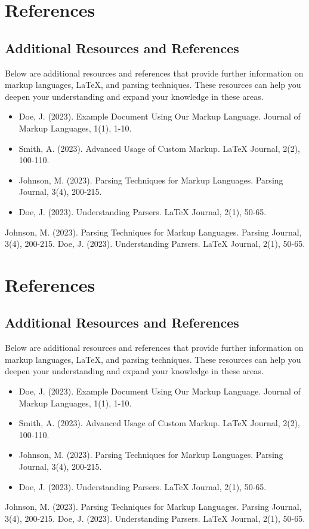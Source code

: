 \documentclass[oneside]{book}
\begin{document}
\newpage
\chapter{References}
\section{Additional Resources and References}
Below are additional resources and references that provide further information on markup languages, LaTeX, and parsing techniques. These resources can help you deepen your understanding and expand your knowledge in these areas.\par
\begin{itemize}
\item Doe, J. (2023). Example Document Using Our Markup Language. Journal of Markup Languages, 1(1), 1-10.
\item Smith, A. (2023). Advanced Usage of Custom Markup. LaTeX Journal, 2(2), 100-110.
\item Johnson, M. (2023). Parsing Techniques for Markup Languages. Parsing Journal, 3(4), 200-215.
\item Doe, J. (2023). Understanding Parsers. LaTeX Journal, 2(1), 50-65.
\end{itemize}
\begin{thebibliography}{100}
Johnson, M. (2023). Parsing Techniques for Markup Languages. Parsing Journal, 3(4), 200-215.
Doe, J. (2023). Understanding Parsers. LaTeX Journal, 2(1), 50-65.
\end{thebibliography}

\newpage
\chapter{References}
\section{Additional Resources and References}
Below are additional resources and references that provide further information on markup languages, LaTeX, and parsing techniques. These resources can help you deepen your understanding and expand your knowledge in these areas.\par
\begin{itemize}
\item Doe, J. (2023). Example Document Using Our Markup Language. Journal of Markup Languages, 1(1), 1-10.
\item Smith, A. (2023). Advanced Usage of Custom Markup. LaTeX Journal, 2(2), 100-110.
\item Johnson, M. (2023). Parsing Techniques for Markup Languages. Parsing Journal, 3(4), 200-215.
\item Doe, J. (2023). Understanding Parsers. LaTeX Journal, 2(1), 50-65.
\end{itemize}
\begin{thebibliography}{100}
Johnson, M. (2023). Parsing Techniques for Markup Languages. Parsing Journal, 3(4), 200-215.
Doe, J. (2023). Understanding Parsers. LaTeX Journal, 2(1), 50-65.
\end{thebibliography}
\end{document}
